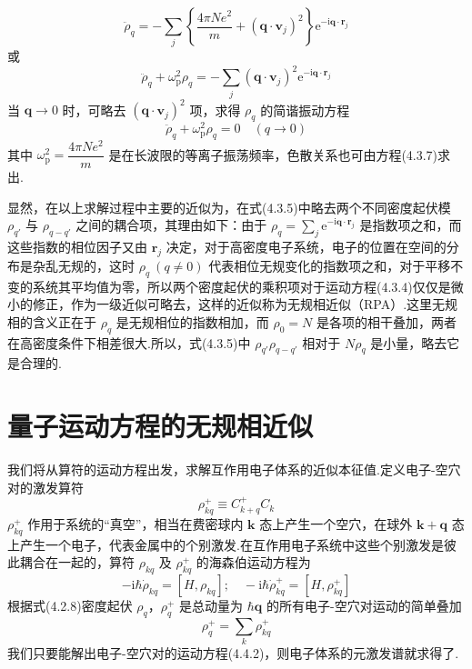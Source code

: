 \begin{equation}
  \ddot{\rho}_{q}=-\sum_{j}\left\{\frac{4\pi Ne^{2}}{m}
  +\left(\boldsymbol{q}\cdot\boldsymbol{v}_{j}\right)^{2}\right\}
  \mathrm{e}^{-\mathrm{i}\boldsymbol{q}\cdot\boldsymbol{r}_{j}}
\end{equation}
或
\begin{equation}
  \ddot{\rho}_{q}+\omega_{\mathrm{p}}^{2}\rho_{q}
  =-\sum_{j}\left(\boldsymbol{q}\cdot\boldsymbol{v}_{j}\right)^{2}
  \mathrm{e}^{-\mathrm{i}\boldsymbol{q}\cdot\boldsymbol{r}_{j}}
\end{equation}
当 $\boldsymbol{q}\to 0$ 时，可略去 $\left(\boldsymbol{q}\cdot\boldsymbol{v}_{j}\right)^{2}$ 项，求得 $\rho_{q}$ 的简谐振动方程
\begin{equation}
  \ddot{\rho}_{q}+\omega_{\mathrm{p}}^{2}\rho_{q}=0\quad(q\to 0)
\end{equation}
其中 $\omega_{\mathrm{p}}^{2}=\dfrac{4\pi Ne^{2}}{m}$ 是在长波限的等离子振荡频率，色散关系也可由方程(4.3.7)求出.

显然，在以上求解过程中主要的近似为，在式(4.3.5)中略去两个不同密度起伏模 $\rho_{q'}$ 与 $\rho_{q-q'}$ 之间的耦合项，其理由如下：由于 $\rho_{q}=\displaystyle\sum_{j}\mathrm{e}^{-\mathrm{i}\boldsymbol{q}\cdot\boldsymbol{r}_{j}}$ 是指数项之和，而这些指数的相位因子又由 $\boldsymbol{r}_{j}$ 决定，对于高密度电子系统，电子的位置在空间的分布是杂乱无规的，这时 $\rho_{q}\ (q\neq 0)$ 代表相位无规变化的指数项之和，对于平移不变的系统其平均值为零，所以两个密度起伏的乘积项对于运动方程(4.3.4)仅仅是微小的修正，作为一级近似可略去，这样的近似称为无规相近似（RPA）.这里无规相的含义正在于 $\rho_{q}$ 是无规相位的指数相加，而 $\rho_{0}=N$ 是各项的相干叠加，两者在高密度条件下相差很大.所以，式(4.3.5)中 $\rho_{q'}\rho_{q-q'}$ 相对于 $N\rho_{q}$ 是小量，略去它是合理的.

\section{量子运动方程的无规相近似}

我们将从算符的运动方程出发，求解互作用电子体系的近似本征值.定义电子-空穴对的激发算符
\begin{equation}
  \rho_{kq}^{+}\equiv C_{k+q}^{+}C_{k}
\end{equation}
$\rho_{kq}^{+}$ 作用于系统的“真空”，相当在费密球内 $\boldsymbol{k}$ 态上产生一个空穴，在球外 $\boldsymbol{k}+\boldsymbol{q}$ 态上产生一个电子，代表金属中的个别激发.在互作用电子系统中这些个别激发是彼此耦合在一起的，算符 $\rho_{kq}$ 及 $\rho_{kq}^{+}$ 的海森伯运动方程为
\begin{equation}
  -\mathrm{i}\hbar\dot{\rho}_{kq}=[H,\rho_{kq}];\quad
  -\mathrm{i}\hbar\dot{\rho}_{kq}^{+}=[H,\rho_{kq}^{+}]
\end{equation}
根据式(4.2.8)密度起伏 $\rho_{q}$，$\rho_{q}^{+}$ 是总动量为 $\hbar\boldsymbol{q}$ 的所有电子-空穴对运动的简单叠加
\begin{equation}
  \rho_{q}^{+}=\sum_{k}\rho_{kq}^{+}
\end{equation}
我们只要能解出电子-空穴对的运动方程(4.4.2)，则电子体系的元激发谱就求得了.

